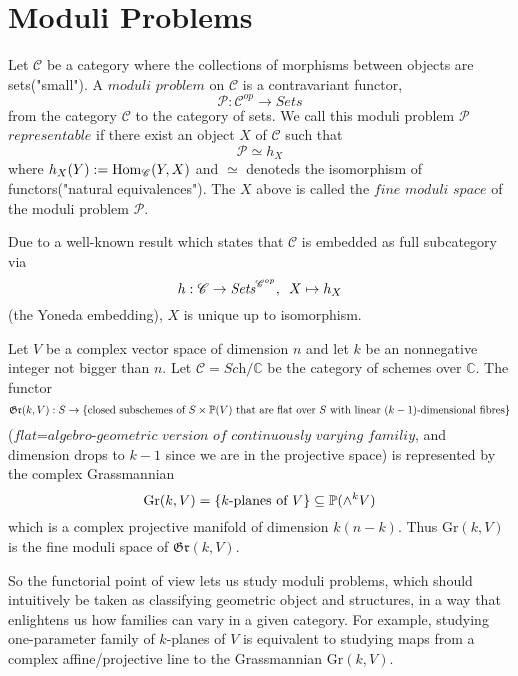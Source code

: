 \documentclass[a4paper,11pt]{article}
\begin{document}
\section{Moduli Problems}

\begin{defn}
Let $\mathcal{C}$ be a category where the collections of morphisms between objects are sets("small").
A $\textit{moduli problem}$ on $\mathcal{C}$ is a contravariant functor,
\[
\mathcal{P}:\mathcal{C}^{op} \to \textit{Sets}
\]
from the category $\mathcal{C}$ to the category of sets.
We call this moduli problem $\mathcal{P}$ $\textit{representable}$ if there exist an object $X$ of $\mathcal{C}$ such that
\[
\mathcal{P} \simeq h_X
\]
where $h_X(Y):=\textnormal{Hom}_{\mathcal{C}}(Y,X)$ and $\simeq$ denoteds the isomorphism of functors("natural equivalences").
The $X$ above is called the $\textit{fine moduli space}$ of the moduli problem $\mathcal{P}$.
\end{defn}

\begin{rem}
Due to a well-known result which states that $\mathcal{C}$ is embedded as full subcategory via
\[
h:\mathcal{C}\to\textit{Sets}^{\mathcal{C}^{op}}, \enskip X \mapsto h_X
\]
(the Yoneda embedding), $X$ is unique up to isomorphism.
\end{rem}

\begin{exm}
Let $V$ be a complex vector space of dimension $n$ and let $k$ be an nonnegative integer not bigger than $n$.
Let $\mathcal{C}=\textit{Sch}/\mathbb{C}$ be the category of schemes over $\mathbb{C}$.
The functor
\[
\mathfrak{Gr}(k,V):S\to\{\textnormal{closed subschemes of }S\times\mathbb{P}(V)\textnormal{ that are flat over $S$ with linear $(k-1)$-dimensional fibres}\}
\]
($\textit{flat=algebro-geometric version of continuously varying familiy}$, and dimension drops to $k-1$ since we are in the projective space) is represented by the complex Grassmannian
\[
\textnormal{Gr}(k,V) = \{k\textnormal{-planes of }V\} \subseteq \mathbb{P}(\wedge^kV)
\]
which is a complex projective manifold of dimension $k(n-k)$.
Thus Gr$(k,V)$ is the fine moduli space of $\mathfrak{Gr}(k,V)$.
\end{exm}

So the functorial point of view lets us study moduli problems, which should intuitively be taken as classifying geometric object and structures, in a way that enlightens us how families can vary in a given category.
For example, studying one-parameter family of $k$-planes of $V$ is equivalent to studying maps from a complex affine/projective line to the Grassmannian Gr$(k,V)$.
\end{document}
